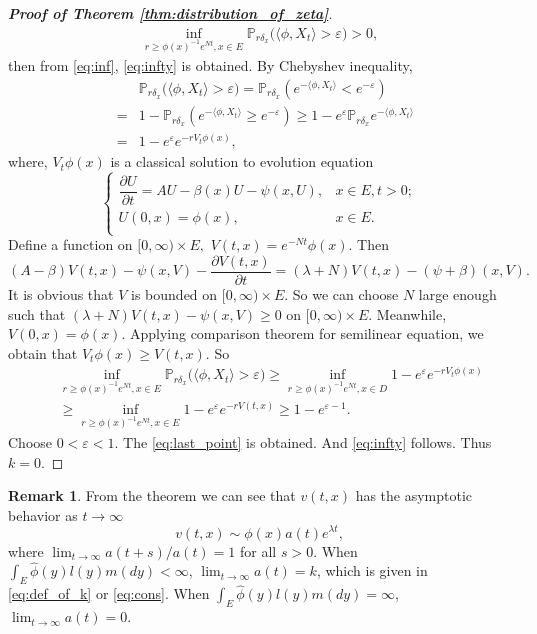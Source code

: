 \documentclass[12pt,a4paper]{amsart}
\numberwithin{equation}{section}
\theoremstyle{plain}
\theoremstyle{definition}
\newtheorem{rem}[thm]{Remark}
\begin{document}
\begin{proof}[{\bf Proof of Theorem \ref{thm:distribution_of_zeta}}]
\begin{eqnarray}
    \inf_{r\geq \phi(x)^{-1}e^{Nt}, x\in E}\mathbb P_{r\delta_x}\big(\langle\phi, X_t
    \rangle >\varepsilon\big)>0,
  \end{eqnarray}
	then from \eqref{eq:inf}, \eqref{eq:infty} is obtained.  By Chebyshev inequality,
  \begin{eqnarray*}
    &&\mathbb P_{r\delta_x}\big(\langle\phi, X_t\rangle >\varepsilon\big)=\mathbb P_{r\delta_x}\left(e^{-\langle\phi, X_t\rangle }<e^{-\varepsilon}\right)\\
    &=&1-\mathbb P_{r\delta_x}\left(e^{-\langle\phi, X_t
        \rangle }\geq e^{-\varepsilon}\right)\geq 1-e^{\varepsilon }\mathbb P_{r\delta_x}e^{-\langle\phi, X_t\rangle }\\
    &=&1-e^{\varepsilon }e^{-rV_t\phi(x)},
  \end{eqnarray*}
	where, $V_t\phi(x)$ is a classical solution to evolution equation
  \begin{equation}\label{eq:diff}
    \begin{cases}
      \dfrac{\partial U}{\partial t}=AU-\beta(x)U-\psi(x, U),& x\in E, t>0;\\
      U(0,x)=\phi(x),& x\in E.\\
    \end{cases}
  \end{equation}
	Define a function on $[0,\infty)\times E,$ $V(t,x)=e^{-Nt}\phi(x).$  Then
  \[
    (A-\beta)V(t,x)-\psi(x, V)-\frac{\partial V(t,x)}{\partial t}=(\lambda +N)V(t,x)-(\psi+\beta)(x,V).
  \]
	It is obvious that $V$ is bounded on $[0,\infty)\times E$.  So we can choose $N$ large enough such that $(\lambda+N)V(t,x)-\psi(x,V)\geq 0$ on $[0,\infty)\times E.$
	Meanwhile, $V(0,x)=\phi(x)$.  Applying comparison theorem for semilinear equation, we obtain that $V_t\phi(x)\geq V(t,x)$.  So
  \begin{eqnarray*}
    &&\inf_{r\geq \phi(x)^{-1}e^{Nt}, x\in E}\mathbb P_{r\delta_x}\big(\langle\phi, X_t \rangle >\varepsilon\big)\geq \inf_{r\geq \phi(x)^{-1}e^{Nt}, x\in D} 1-e^{\varepsilon}e^{-rV_t\phi(x)}\\
    &&\geq \inf_{r\geq \phi(x)^{-1}e^{Nt}, x\in E} 1-e^{\varepsilon}e^{-rV(t,x)}
       \geq 1-e^{\varepsilon-1}.
  \end{eqnarray*}
	Choose $0<\varepsilon<1.$  The \eqref{eq:last_point} is obtained. And
  \eqref{eq:infty} follows. Thus $k=0$.
\end{proof}

\begin{rem}
  From the theorem we can see that $v(t,x)$  has the asymptotic behavior as $t\to\infty$
  \[
    v(t,x)\sim \phi(x)a(t)e^{\lambda t},
  \]
  where $\lim_{t\rightarrow\infty}a(t+s)/a(t)=1$ for all $s>0$.  When $\int_E\widehat\phi(y)l(y)m(dy)<\infty$, $\lim_{t\rightarrow\infty}a(t)=k$, which is given in \eqref{eq:def_of_k} or \eqref{eq:cons}.  When $\int_E\widehat\phi(y)l(y)m(dy)=\infty$, $\lim_{t\rightarrow\infty}a(t)=0$.
\end{rem}
\end{document}
